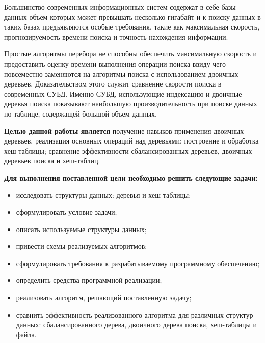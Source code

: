 \Introduction


Большинство  современных  информационных  систем  содержат  в  себе 
базы данных объем которых может превышать несколько гигабайт и к 
поиску  данных  в  таких  базах  предъявляются  особые  требования,  такие  как 
максимальная скорость, прогнозируемость времени поиска и точность 
нахождения информации.

Простые алгоритмы перебора не способны 
обеспечить максимальную скорость и предоставить оценку времени 
выполнения операции поиска ввиду чего повсеместно заменяются на 
алгоритмы  поиска  с  использованием  двоичных  деревьев.  Доказательством 
этого  служит  сравнение  скорости  поиска  в  современных  СУБД.  Именно 
СУБД,  использующие  индексацию  и  двоичные  деревья  поиска  показывают 
наибольшую производительность при поиске данных по таблице, 
содержащей большой объем данных. \cite{avl}

\textbf{Целью данной работы является} получение навыков применения двоичных деревьев, реализация основных операций над деревьями; построение и обработка хеш-таблицы; сравнение эффективности сбалансированных деревьев, двоичных деревьев поиска и хеш-таблиц.

\textbf{Для выполнения поставленной цели необходимо решить следующие задачи: }

\begin{itemize}[$\bullet$]
    \item исследовать структуры данных: деревья и хеш-таблицы;
    \item сформулировать условие задачи;
    \item описать используемые структуры данных;
    \item привести схемы реализуемых алгоритмов;
    \item сформулировать требования к разрабатываемому программному обеспечению;
    \item определить средства программной реализации;
    \item реализовать алгоритм, решающий поставленную задачу;
    \item сравнить эффективность реализованного алгоритма для различных структур данных: сбалансированного дерева, двоичного дерева поиска, хеш-таблицы и файла.
\end{itemize}
